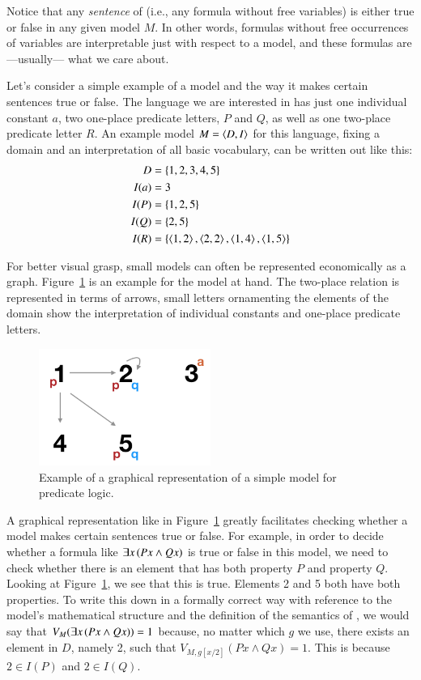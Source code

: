 \documentclass[nobib,nofonts]{tufte-handout}
\newcommand{\predlog}{\acro{PredLog}}
\begin{document}
Notice that any \emph{sentence} of \predlog (i.e., any formula without free variables) is either true or false in any given model $M$.
In other words, formulas without free occurrences of variables are interpretable just with respect to a model, and these formulas are ---usually--- what we care about.

Let's consider a simple example of a model and the way it makes certain sentences true or false.
The language we are interested in has just one individual constant $a$, two one-place predicate letters, $P$ and $Q$, as well as one two-place predicate letter $R$.
An example model $M = \left \langle D, I\right\rangle$ for this language, fixing a domain and an interpretation of all basic vocabulary, can be written out like this:
\begin{align*}
  D    & = \left\{1,2,3,4,5\right\}\\
  I(a) & = 3 \\
  I(P) & = \left\{1,2,5\right\} \\
  I(Q) & = \left\{2,5\right\} \\
  I(R) & = \left\{\left \langle 1,2\right\rangle,\left \langle 2,2\right\rangle, \left \langle 1,4\right\rangle, \left \langle 1,5\right\rangle\right\}
\end{align*}

For better visual grasp, small models can often be represented economically as a graph.
Figure~\ref{fig:predlog-exmple-model} is an example for the model at hand.
The two-place relation is represented in terms of arrows, small letters ornamenting the elements of the domain show the interpretation of individual constants and one-place predicate letters.

\begin{figure}
  \centering
  \includegraphics[width=0.5\textwidth]{00-pics/predlog-example-model.png}
  \caption{Example of a graphical representation of a simple model for predicate logic.}
  \label{fig:predlog-exmple-model}
\end{figure}

A graphical representation like in Figure~\ref{fig:predlog-exmple-model} greatly facilitates checking whether a model makes certain sentences true or false.
For example, in order to decide whether a formula like $\exists x \thinspace (Px \wedge Qx)$ is true or false in this model, we need to check whether there is an element that has both property $P$ and property $Q$.
Looking at Figure~\ref{fig:predlog-exmple-model}, we see that this is true.
Elements 2 and 5 both have both properties.
To write this down in a formally correct way with reference to the model's mathematical structure and the definition of the semantics of \predlog, we would say that $V_{M}(\exists x \thinspace (Px \wedge Qx)) = 1$ because, no matter which $g$ we use, there exists an element in $D$, namely 2, such that $V_{M,g[x/2]}(Px \wedge Qx) = 1$. This is because $2 \in I(P)$ and $2 \in I(Q)$.
\end{document}

